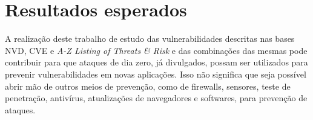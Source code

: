 \section{Resultados esperados}
A realização deste trabalho de estudo das vulnerabilidades descritas nas bases NVD, CVE e \textit{A-Z Listing of Threats \& Risk} e das combinações das mesmas pode contribuir para que ataques de dia zero, já divulgados, possam ser utilizados para prevenir vulnerabilidades em novas aplicações. Isso não significa que seja possível abrir mão de outros meios de prevenção, como de firewalls, sensores, teste de penetração, antivírus, atualizações de navegadores e softwares, para prevenção de ataques.